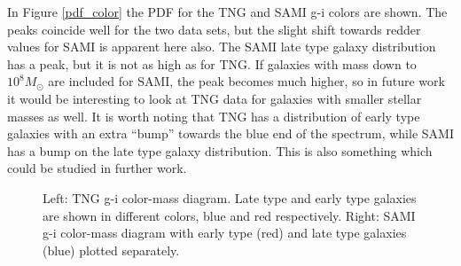 In Figure \ref{pdf_color} the PDF for the TNG and SAMI g-i colors are shown. The peaks coincide well for the two data sets, but the slight shift towards redder values for SAMI is apparent here also. The SAMI late type galaxy distribution has a peak, but it is not as high as for TNG. If galaxies with mass down to $10^8 M_{\odot}$ are included for SAMI, the peak becomes much higher, so in future work it would be interesting to look at TNG data for galaxies with smaller stellar masses as well. It is worth noting that TNG has a distribution of early type galaxies with an extra ``bump'' towards the blue end of the spectrum, while SAMI has a bump on the late type galaxy distribution. This is also something which could be studied in further work. 

\begin{figure}
    \centering
    \caption{Left: TNG g-i color-mass diagram. Late type and early type galaxies are shown in different colors, blue and red respectively. Right: SAMI g-i color-mass diagram with early type (red) and late type galaxies (blue) plotted separately.}
    \label{color_magnitude_res}
\end{figure}


